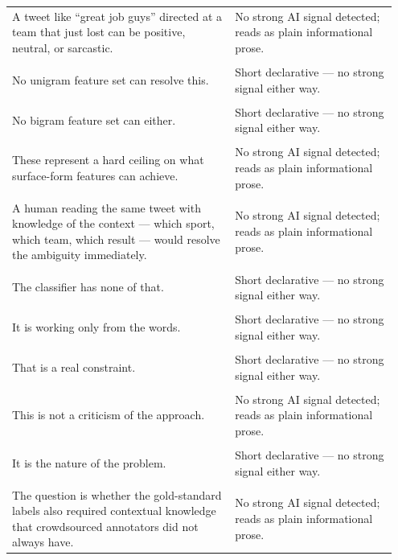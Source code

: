 \documentclass[11pt]{article}
\begin{document}
\begin{longtable}{|p{0.55\linewidth}|p{0.40\linewidth}|}
\hline
\rule{0pt}{3.5cm} & \\
\hline
A tweet like ``great job guys'' directed at a team that just lost can be positive, neutral, or sarcastic. & No strong AI signal detected; reads as plain informational prose. \\[2pt]
\hline
\rule{0pt}{3.5cm} & \\
\hline
No unigram feature set can resolve this. & Short declarative --- no strong signal either way. \\[2pt]
\hline
\rule{0pt}{3.5cm} & \\
\hline
No bigram feature set can either. & Short declarative --- no strong signal either way. \\[2pt]
\hline
\rule{0pt}{3.5cm} & \\
\hline
These represent a hard ceiling on what surface-form features can achieve. & No strong AI signal detected; reads as plain informational prose. \\[2pt]
\hline
\rule{0pt}{3.5cm} & \\
\hline
A human reading the same tweet with knowledge of the context --- which sport, which team, which result --- would resolve the ambiguity immediately. & No strong AI signal detected; reads as plain informational prose. \\[2pt]
\hline
\rule{0pt}{3.5cm} & \\
\hline
The classifier has none of that. & Short declarative --- no strong signal either way. \\[2pt]
\hline
\rule{0pt}{3.5cm} & \\
\hline
It is working only from the words. & Short declarative --- no strong signal either way. \\[2pt]
\hline
\rule{0pt}{3.5cm} & \\
\hline
That is a real constraint. & Short declarative --- no strong signal either way. \\[2pt]
\hline
\rule{0pt}{3.5cm} & \\
\hline
This is not a criticism of the approach. & No strong AI signal detected; reads as plain informational prose. \\[2pt]
\hline
\rule{0pt}{3.5cm} & \\
\hline
It is the nature of the problem. & Short declarative --- no strong signal either way. \\[2pt]
\hline
\rule{0pt}{3.5cm} & \\
\hline
The question is whether the gold-standard labels also required contextual knowledge that crowdsourced annotators did not always have. & No strong AI signal detected; reads as plain informational prose. \\[2pt]

\end{longtable}
\end{document}
